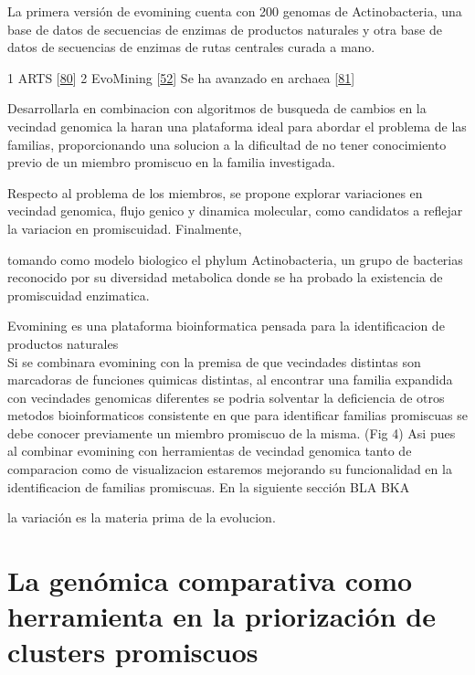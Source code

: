 \documentclass[12pt,twoside]{reedthesis}
\begin{document}
  La primera versión de evomining cuenta con 200 genomas de
  Actinobacteria, una base de datos de secuencias de enzimas de productos
  naturales y otra base de datos de secuencias de enzimas de rutas
  centrales curada a mano.
  
  1 ARTS {[}\protect\hyperlink{ref-alanjary_antibiotic_2017}{80}{]} 2
  EvoMining
  {[}\protect\hyperlink{ref-cruz-morales_phylogenomic_2016}{52}{]} Se ha
  avanzado en archaea
  {[}\protect\hyperlink{ref-martinez-nunez_promiscuity_Archaea_2017}{81}{]}
  
  Desarrollarla en combinacion con algoritmos de busqueda de cambios en la
  vecindad genomica la haran una plataforma ideal para abordar el problema
  de las familias, proporcionando una solucion a la dificultad de no tener
  conocimiento previo de un miembro promiscuo en la familia investigada.
  
  Respecto al problema de los miembros, se propone explorar variaciones en
  vecindad genomica, flujo genico y dinamica molecular, como candidatos a
  reflejar la variacion en promiscuidad. Finalmente,
  
  tomando como modelo biologico el phylum Actinobacteria, un grupo de
  bacterias reconocido por su diversidad metabolica donde se ha probado la
  existencia de promiscuidad enzimatica.
  
  Evomining es una plataforma bioinformatica pensada para la
  identificacion de productos naturales\\
  Si se combinara evomining con la premisa de que vecindades distintas son
  marcadoras de funciones quimicas distintas, al encontrar una familia
  expandida con vecindades genomicas diferentes se podria solventar la
  deficiencia de otros metodos bioinformaticos consistente en que para
  identificar familias promiscuas se debe conocer previamente un miembro
  promiscuo de la misma. (Fig 4) Asi pues al combinar evomining con
  herramientas de vecindad genomica tanto de comparacion como de
  visualizacion estaremos mejorando su funcionalidad en la identificacion
  de familias promiscuas. En la siguiente sección BLA BKA
  
  la variación es la materia prima de la evolucion.
  
  \section{La genómica comparativa como herramienta en la priorización de
  clusters
  promiscuos}\label{la-genomica-comparativa-como-herramienta-en-la-priorizacion-de-clusters-promiscuos}
  
\end{document}
